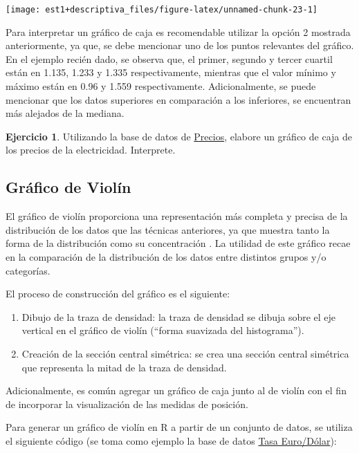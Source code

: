 \documentclass[
  11pt,
]{book}
\providecommand{\tightlist}{%
  \setlength{\itemsep}{0pt}\setlength{\parskip}{0pt}}
\theoremstyle{definition}
\theoremstyle{definition}
\theoremstyle{definition}
\newtheorem{exercise}{Ejercicio}[chapter]
\theoremstyle{definition}
\theoremstyle{remark}
\begin{document}
\begin{center}\texttt{[image: est1+descriptiva\_files/figure-latex/unnamed-chunk-23-1]} \end{center}

Para interpretar un gráfico de caja es recomendable utilizar la opción 2 mostrada anteriormente, ya que, se debe mencionar uno de los puntos relevantes del gráfico. En el ejemplo recién dado, se observa que, el primer, segundo y tercer cuartil están en 1.135, 1.233 y 1.335 respectivamente, mientras que el valor mínimo y máximo están en 0.96 y 1.559 respectivamente. Adicionalmente, se puede mencionar que los datos superiores en comparación a los inferiores, se encuentran más alejados de la mediana.

\begin{exercise}
Utilizando la base de datos de \hyperref[PreciosElectricidad]{Precios}, elabore un gráfico de caja de los precios de la electricidad. Interprete.
\end{exercise}

\subsection{Gráfico de Violín}\label{gruxe1fico-de-violuxedn}

El gráfico de violín proporciona una representación más completa y precisa de la distribución de los datos que las técnicas anteriores, ya que muestra tanto la forma de la distribución como su concentración \citep{hintze1998violin}. La utilidad de este gráfico recae en la comparación de la distribución de los datos entre distintos grupos y/o categorías.

El proceso de construcción del gráfico es el siguiente:

\begin{enumerate}
\def\labelenumi{\arabic{enumi}.}
\tightlist
\item
  Dibujo de la traza de densidad: la traza de densidad se dibuja sobre el eje vertical en el gráfico de violín (``forma suavizada del histograma'').
\item
  Creación de la sección central simétrica: se crea una sección central simétrica que representa la mitad de la traza de densidad.
\end{enumerate}

Adicionalmente, es común agregar un gráfico de caja junto al de violín con el fin de incorporar la visualización de las medidas de posición.

Para generar un gráfico de violín en R a partir de un conjunto de datos, se utiliza el siguiente código (se toma como ejemplo la base de datos \hyperref[TasaEURUSD]{Tasa Euro/Dólar}):
\end{document}
